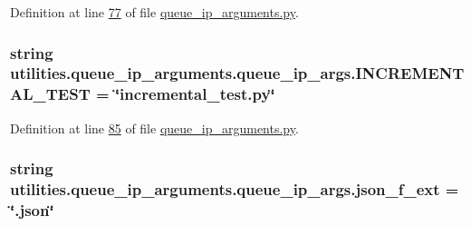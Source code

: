 Definition at line \hyperlink{queue__ip__arguments_8py_source_l00077}{77} of file \hyperlink{queue__ip__arguments_8py_source}{queue\+\_\+ip\+\_\+arguments.\+py}.

\hypertarget{classutilities_1_1queue__ip__arguments_1_1queue__ip__args_a849b659d7a9d7689c4c707502d1684d5}{}
\subsubsection[{I\+N\+C\+R\+E\+M\+E\+N\+T\+A\+L\+\_\+\+T\+E\+S\+T}]{\setlength{\rightskip}{0pt plus 5cm}string utilities.\+queue\+\_\+ip\+\_\+arguments.\+queue\+\_\+ip\+\_\+args.\+I\+N\+C\+R\+E\+M\+E\+N\+T\+A\+L\+\_\+\+T\+E\+S\+T = \char`\"{}incremental\+\_\+test.\+py\char`\"{}\hspace{0.3cm}{\ttfamily [static]}}\label{classutilities_1_1queue__ip__arguments_1_1queue__ip__args_a849b659d7a9d7689c4c707502d1684d5}


Definition at line \hyperlink{queue__ip__arguments_8py_source_l00085}{85} of file \hyperlink{queue__ip__arguments_8py_source}{queue\+\_\+ip\+\_\+arguments.\+py}.

\hypertarget{classutilities_1_1queue__ip__arguments_1_1queue__ip__args_a8d93f9ade7608583602a9948c0d744f7}{}
\subsubsection[{json\+\_\+f\+\_\+ext}]{\setlength{\rightskip}{0pt plus 5cm}string utilities.\+queue\+\_\+ip\+\_\+arguments.\+queue\+\_\+ip\+\_\+args.\+json\+\_\+f\+\_\+ext = \char`\"{}.json\char`\"{}\hspace{0.3cm}{\ttfamily [static]}}\label{classutilities_1_1queue__ip__arguments_1_1queue__ip__args_a8d93f9ade7608583602a9948c0d744f7}


